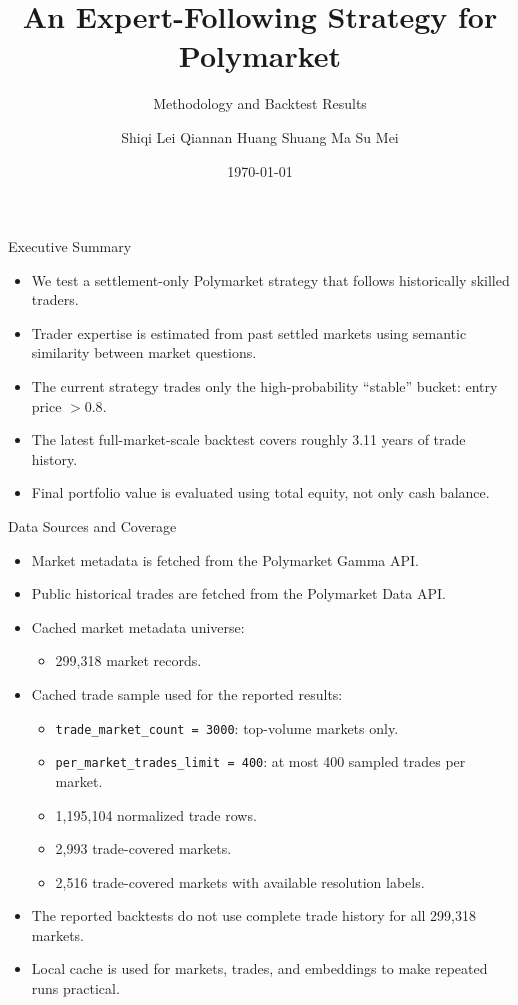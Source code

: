 \documentclass[11pt,aspectratio=169]{beamer}
\title[Polymarket Expert-Following Strategy]{An Expert-Following Strategy for Polymarket}
\subtitle{Methodology and Backtest Results}
\author{\texorpdfstring{Shiqi Lei \qquad Qiannan Huang \qquad Shuang Ma \qquad Su Mei}{Shiqi Lei, Qiannan Huang, Shuang Ma, Su Mei}}
\date{\today}
\begin{document}
\begin{frame}
  \titlepage
\end{frame}

\begin{frame}{Executive Summary}
  \begin{itemize}
    \item We test a settlement-only Polymarket strategy that follows historically skilled traders.
    \item Trader expertise is estimated from past settled markets using semantic similarity between market questions.
    \item The current strategy trades only the high-probability ``stable'' bucket: entry price $>0.8$.
    \item The latest full-market-scale backtest covers roughly 3.11 years of trade history.
    \item Final portfolio value is evaluated using total equity, not only cash balance.
  \end{itemize}
\end{frame}

\begin{frame}{Data Sources and Coverage}
  \begin{itemize}
    \item Market metadata is fetched from the Polymarket Gamma API.
    \item Public historical trades are fetched from the Polymarket Data API.
    \item Cached market metadata universe:
      \begin{itemize}
        \item 299,318 market records.
      \end{itemize}
    \item Cached trade sample used for the reported results:
      \begin{itemize}
        \item \texttt{trade\_market\_count = 3000}: top-volume markets only.
        \item \texttt{per\_market\_trades\_limit = 400}: at most 400 sampled trades per market.
        \item 1,195,104 normalized trade rows.
        \item 2,993 trade-covered markets.
        \item 2,516 trade-covered markets with available resolution labels.
      \end{itemize}
    \item The reported backtests do not use complete trade history for all 299,318 markets.
    \item Local cache is used for markets, trades, and embeddings to make repeated runs practical.
  \end{itemize}
\end{frame}
\end{document}

